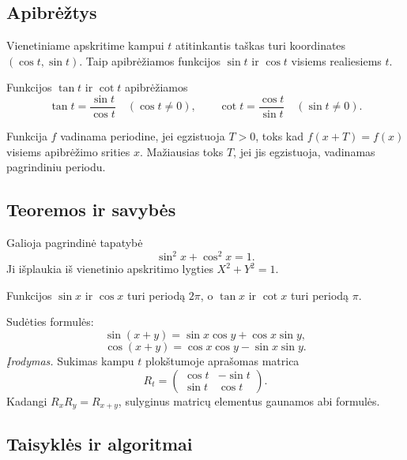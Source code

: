 \subsection{Apibrėžtys}

\begin{apibreztis}
Vienetiniame apskritime kampui $t$ atitinkantis taškas turi koordinates $(\cos t,\sin t)$. Taip apibrėžiamos funkcijos $\sin t$ ir $\cos t$ visiems realiesiems $t$.
\end{apibreztis}

\begin{apibreztis}
Funkcijos $\tan t$ ir $\cot t$ apibrėžiamos
\[
\tan t=\frac{\sin t}{\cos t}\quad(\cos t\ne0),\qquad
\cot t=\frac{\cos t}{\sin t}\quad(\sin t\ne0).
\]
\end{apibreztis}

\begin{apibreztis}
Funkcija $f$ vadinama periodine, jei egzistuoja $T>0$, toks kad $f(x+T)=f(x)$ visiems apibrėžimo srities $x$. Mažiausias toks $T$, jei jis egzistuoja, vadinamas pagrindiniu periodu.
\end{apibreztis}

\subsection{Teoremos ir savybės}

\begin{savybe}
Galioja pagrindinė tapatybė
\[
\sin^2 x+\cos^2 x=1.
\]
Ji išplaukia iš vienetinio apskritimo lygties $X^2+Y^2=1$.
\end{savybe}

\begin{savybe}
Funkcijos $\sin x$ ir $\cos x$ turi periodą $2\pi$, o $\tan x$ ir $\cot x$ turi periodą $\pi$.
\end{savybe}

\begin{teorema}
Sudėties formulės:
\[
\sin(x+y)=\sin x\cos y+\cos x\sin y,
\]
\[
\cos(x+y)=\cos x\cos y-\sin x\sin y.
\]
\emph{Įrodymas.} Sukimas kampu $t$ plokštumoje aprašomas matrica
\[
R_t=\begin{pmatrix}\cos t&-\sin t\\ \sin t&\cos t\end{pmatrix}.
\]
Kadangi $R_xR_y=R_{x+y}$, sulyginus matricų elementus gaunamos abi formulės.
\end{teorema}

\subsection{Taisyklės ir algoritmai}

